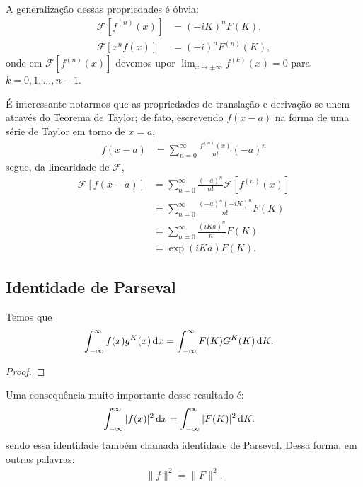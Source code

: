 A generalização dessas propriedades é óbvia:
\begin{align*}
    \mathcal{F}\left[ f^{(n)}(x) \right] &= (-i K)^n F(K), \\
    \mathcal{F}\left[ x^n f(x) \right] &= (-i)^n F^{(n)}(K),
\end{align*}
onde em $\mathcal{F}\left[ f^{(n)}(x) \right]$ devemos upor $\lim_{x \to
\pm\infty} f^{(k)}(x) = 0$ para $k = 0, 1, \ldots, n - 1$.
\begin{obs}
    É interessante notarmos que as propriedades de translação e
    derivação se unem através do Teorema de Taylor; de fato,
    escrevendo $f(x - a)$ na forma de uma série de Taylor em torno de $x =
    a$,
    \begin{align*}
        f(x - a) &= \sum_{n = 0}^\infty \frac{f^{(n)}(x)}{n!}(-a)^n
    \end{align*}
    segue, da linearidade de $\mathcal{F}$,
    \begin{align*}
        \mathcal{F}\left[ f(x - a) \right] &= \sum_{n = 0}^\infty
        \frac{(-a)^n}{n!} \mathcal{F}\left [f^{(n)}(x) \right] \\
        &= \sum_{n = 0}^\infty \frac{(-a)^n (-iK)^n}{n!} F(K) \\
        &= \sum_{n = 0}^\infty \frac{(i K a)^n}{n!} F(K) \\
        &= \exp\left( i K a \right) F(K).
    \end{align*}
\end{obs}

\subsection{Identidade de Parseval}
Temos que
\begin{align*}
    \int_{-\infty}^\infty f(x) g^K(x) \, \mathrm{d}x &= \int_{-\infty}^\infty F(K)
    G^K(K) \, \mathrm{d}K.
\end{align*}
\begin{proof}
\end{proof}
Uma consequência muito importante desse resultado é:
\begin{align*}
    \int_{-\infty}^\infty |f(x)|^2 \, \mathrm{d}x &= \int_{-\infty}^\infty |F(K)|^2
    \, \mathrm{d}K.
\end{align*}
sendo essa identidade também chamada identidade de Parseval. Dessa forma, em
outras palavras:
\begin{align*}
    \| f \|^2 = \| F \|^2.
\end{align*}

